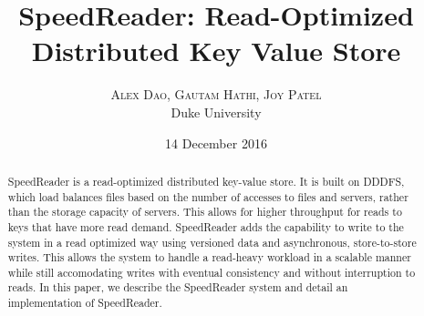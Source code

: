 \documentclass[twoside]{article}
\title{\vspace{-15mm}\fontsize{24pt}{10pt}\selectfont\textbf{SpeedReader: Read-Optimized Distributed Key Value Store}} %
\author{
\large
\textsc{Alex Dao, Gautam Hathi, Joy Patel}\\[2mm] %
\normalsize Duke University \\ %
\vspace{-5mm}
}
\date{14 December 2016}
\begin{document}
\maketitle %

\thispagestyle{fancy} %


\begin{abstract}

\noindent SpeedReader is a read-optimized distributed key-value store. It is built on DDDFS, which load balances files based on the number of accesses to files and servers, rather than the storage capacity of servers. This allows for higher throughput for reads to keys that have more read demand. SpeedReader adds the capability to write to the system in a read optimized way using versioned data and asynchronous, store-to-store writes. This allows the system to handle a read-heavy workload in a scalable manner while still accomodating writes with eventual consistency and without interruption to reads. In this paper, we describe the SpeedReader system and detail an implementation of SpeedReader.

\end{abstract}

\end{document}
